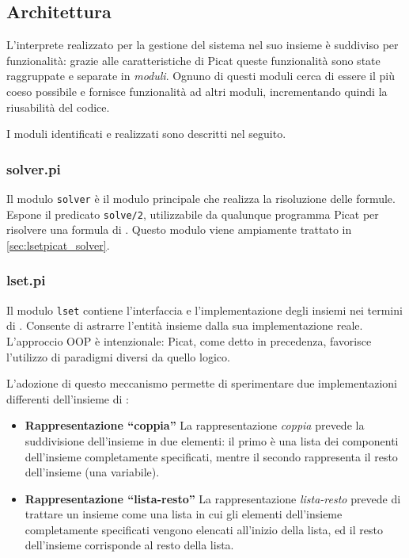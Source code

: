 \documentclass[12pt,a4paper,openright]{book} %
\begin{document}
\subsection{Architettura}
\label{subsec:lsetpicat_architecture}

L'interprete realizzato per la gestione del sistema nel suo insieme è
suddiviso per funzionalità: grazie alle caratteristiche di Picat
queste funzionalità sono state raggruppate e separate in
\emph{moduli}. Ognuno di questi moduli cerca di essere il più coeso
possibile e fornisce funzionalità ad altri moduli, incrementando
quindi la riusabilità del codice.

I moduli identificati e realizzati sono descritti nel seguito.

\subsubsection{solver.pi}

Il modulo \texttt{solver} è il modulo principale che realizza la
risoluzione delle formule. Espone il predicato \verb|solve/2|,
utilizzabile da qualunque programma Picat per risolvere una formula di
\lset{}. Questo modulo viene ampiamente trattato in
\ref{sec:lsetpicat_solver}.

\subsubsection{lset.pi}

Il modulo \texttt{lset} contiene l'interfaccia e l'implementazione
degli insiemi nei termini di \lset{}. Consente di astrarre l'entità
insieme dalla sua implementazione reale. L'approccio OOP è
intenzionale: Picat, come detto in precedenza, favorisce l'utilizzo di
paradigmi diversi da quello logico.

L'adozione di questo meccanismo permette di sperimentare due
implementazioni differenti dell'insieme di \lset{}:

\begin{itemize}
	\item \textbf{Rappresentazione ``coppia''} La rappresentazione
          \emph{coppia} prevede la suddivisione dell'insieme in due
          elementi: il primo è una lista dei componenti dell'insieme
          completamente specificati, mentre il secondo rappresenta il
          resto dell'insieme (una variabile).
	\item \textbf{Rappresentazione ``lista-resto''} La
          rappresentazione \emph{lista-resto} prevede di trattare un
          insieme come una lista in cui gli elementi dell'insieme
          completamente specificati vengono elencati all'inizio della
          lista, ed il resto dell'insieme corrisponde al resto della
          lista.
\end{itemize}
\end{document}
